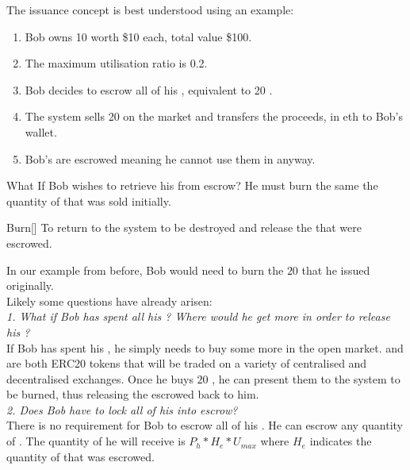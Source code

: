 \noindent The issuance concept is best understood using an example:
\begin{enumerate}
\item{Bob owns 10 \HAV{} worth \$10 each, total value \$100.}
\item{The maximum utilisation ratio is 0.2.}
\item{Bob decides to escrow all of his \HAV{}, equivalent to 20 \NOM{}.}
\item{The system sells 20 \NOM{} on the market and transfers the proceeds, in eth to Bob's wallet.}
\item{Bob's \HAV{} are escrowed meaning he cannot use them in anyway.}
\end{enumerate} 

\newpage

\noindent What If Bob wishes to retrieve his \HAV{} from escrow? He must burn the same the quantity of \NOM{} that was sold initially. \\

\begin{namedthm}{Burn}[]
To return \NOM{} to the system to be destroyed and release the \HAV{} that were escrowed. 
\end{namedthm}

\noindent In our example from before, Bob would need to burn the $20$ \NOM{} that he issued originally. \\

\noindent Likely some questions have already arisen: \\

\noindent \emph{1. What if Bob has spent all his \NOM{}? Where would he get more in order to release his \HAV{}?} \\ 

\noindent If Bob has spent his \NOM{}, he simply needs to buy some more in the open market. \HAV{} and \NOM{} are both ERC20 tokens that will be traded on a variety of centralised and decentralised exchanges. Once he buys $20$ \NOM{}, he can present them to the system to be burned, thus releasing the escrowed \HAV{} back to him. \\ 

\noindent \emph{2. Does Bob have to lock all of his \HAV{} into escrow?} \\ 

\noindent There is no requirement for Bob to escrow all of his \HAV{}. He can escrow any quantity of \HAV{}. The quantity of \NOM{} he will receive is $ P_h * H_e * U_{max} $ where $H_e$ indicates the quantity of \HAV{} that was escrowed. \\

